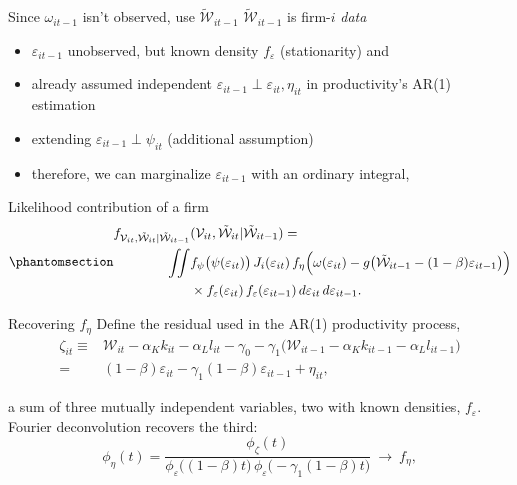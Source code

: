 \documentclass[
  ignorenonframetext,
  aspectratio=169,
]{beamer}
\providecommand{\tightlist}{%
  \setlength{\itemsep}{0pt}\setlength{\parskip}{0pt}}
\begin{document}
\begin{frame}{Since \(\omega_{it-1}\) isn't observed, use
\(\tilde{\mathcal W}_{it-1}\)}
\protect{}\label{since-omega_it-1-isnt-observed-use-tildemathcal-w_it-1}
\(\tilde{\mathcal W}_{it-1}\) is firm-\(i\) \emph{data}

\begin{itemize}
\tightlist
\item
  \(\varepsilon_{it-1}\) unobserved, but known density \(f_\varepsilon\)
  (stationarity) and
\item
  already assumed independent
  \(\varepsilon_{it-1}\perp\varepsilon_{it},\eta_{it}\) in
  productivity's AR(1) estimation
\item
  extending \(\varepsilon_{it-1}\perp\psi_{it}\) (additional assumption)
\item
  therefore, we can marginalize \(\varepsilon_{it-1}\) with an ordinary
  integral,
\end{itemize}
\end{frame}

\begin{frame}{Likelihood contribution of a firm}
\protect{}\label{likelihood-contribution-of-a-firm}
\begin{equation}\protect\phantomsection\label{eq-Lunc-dynamic}{
\begin{aligned}
    f_{\mathcal V_{it},\tilde{\mathcal W}_{it}\mid \tilde{\mathcal W}_{it-1}}&(\mathcal V_{it},\tilde{\mathcal W}_{it}|\tilde{\mathcal W}_{it-1})=\\
    \iint &f_\psi\big(\psi(\varepsilon_{it})\big)\,J_i(\varepsilon_{it})\,f_\eta\Big(\omega(\varepsilon_{it})-g\big(\tilde{\mathcal W}_{it-1}-(1-\beta)\varepsilon_{it-1}\big)\Big)\\
    &\times f_\varepsilon(\varepsilon_{it})\,f_\varepsilon(\varepsilon_{it-1})\,d\varepsilon_{it}\,d\varepsilon_{it-1}.
\end{aligned}
}\end{equation}
\end{frame}

\begin{frame}{Recovering \(f_\eta\)}
\protect{}\label{recovering-f_eta}
Define the residual used in the AR(1) productivity process, \[
\begin{aligned}
\zeta_{it}\equiv{}&\mathcal W_{it}-\alpha_Kk_{it}-\alpha_Ll_{it}-\gamma_0-\gamma_1\big(\mathcal W_{it-1}-\alpha_Kk_{it-1}-\alpha_Ll_{it-1}\big)\\
={}&(1-\beta)\varepsilon_{it}-\gamma_1(1-\beta)\varepsilon_{it-1}+\eta_{it},
\end{aligned}
\]

a sum of three mutually independent variables, two with known densities,
\(f_\varepsilon\). Fourier deconvolution recovers the third: \[
\phi_\eta(t)=\frac{\phi_\zeta(t)}{\phi_\varepsilon\big((1-\beta)t\big)\,\phi_\varepsilon\big(-\gamma_1(1-\beta)t\big)}\ \longrightarrow\ f_\eta,
\]
\end{frame}
\end{document}
